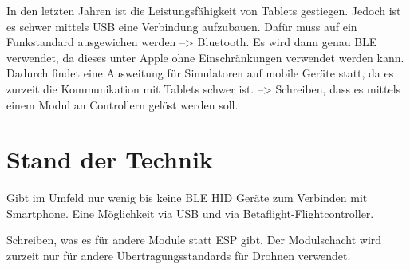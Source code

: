 In den letzten Jahren ist die Leistungsfähigkeit von Tablets gestiegen. Jedoch ist es schwer mittels USB eine Verbindung aufzubauen. Dafür muss auf ein Funkstandard ausgewichen werden --> Bluetooth.
Es wird dann genau BLE verwendet, da dieses unter Apple ohne Einschränkungen verwendet werden kann.
Dadurch findet eine Ausweitung für Simulatoren auf mobile Geräte statt, da es zurzeit die Kommunikation mit Tablets schwer ist.
--> Schreiben, dass es mittels einem Modul an Controllern gelöst werden soll.

\section{Stand der Technik}

Gibt im Umfeld nur wenig bis keine BLE HID Geräte zum Verbinden mit Smartphone. Eine Möglichkeit via USB und via Betaflight-Flightcontroller.

Schreiben, was es für andere Module statt ESP gibt. Der Modulschacht wird zurzeit nur für andere Übertragungsstandards für Drohnen verwendet.

